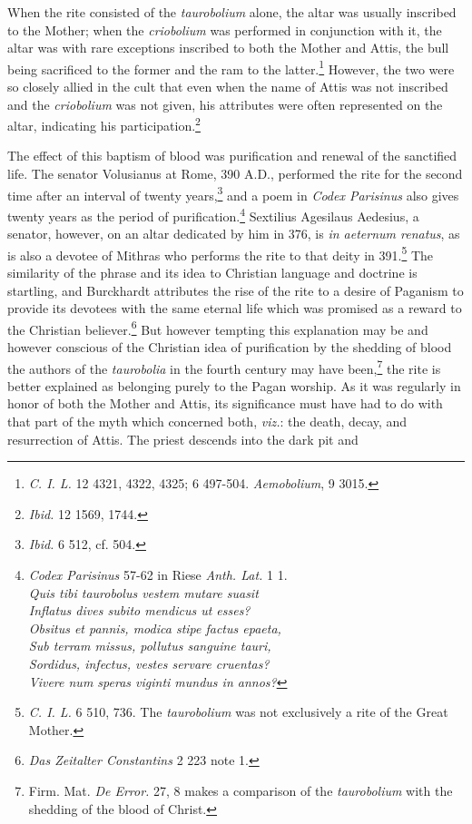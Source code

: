 \documentclass[a4paper, 11pt, oneside, polutonikogreek, english]{article}
\begin{document}
When the rite consisted of the \emph{taurobolium} alone, the altar was usually inscribed to the Mother; when the \emph{criobolium} was performed in conjunction with it, the altar was with rare exceptions inscribed to both the Mother and Attis, the bull being sacrificed to the former and the ram to the latter.\footnote{\emph{C. I. L.} 12 4321, 4322, 4325; 6 497-504. \emph{Aemobolium}, 9 3015.} However, the two were so closely allied in the cult that even when the name of Attis was not inscribed and the \emph{criobolium} was not given, his attributes were often represented on the altar, indicating his participation.\footnote{\emph{Ibid.} 12 1569, 1744.}

The effect of this baptism of blood was purification and renewal of the sanctified life. The senator Volusianus at Rome, 390 \textsc{A.D.}, performed the rite for the second time after an interval of twenty years,\footnote{\emph{Ibid.} 6 512, cf. 504.} and a poem in \emph{Codex Parisinus} also gives twenty years as the period of purification.\footnote{\emph{Codex Parisinus} 57-62 in Riese \emph{Anth. Lat.} 1 1.\\\hspace*{10mm}\emph{Quis tibi taurobolus vestem mutare suasit}\\\hspace*{10mm}\emph{Inflatus dives subito mendicus ut esses?}\\\hspace*{10mm}\emph{Obsitus et pannis, modica stipe factus epaeta,}\\\hspace*{10mm}\emph{Sub terram missus, pollutus sanguine tauri,}\\\hspace*{10mm}\emph{Sordidus, infectus, vestes servare cruentas?}\\\hspace*{10mm}\emph{Vivere num speras viginti mundus in annos?}} Sextilius Agesilaus Aedesius, a senator, however, on an altar dedicated by him in 376, is \emph{in aeternum renatus}, as is also a devotee of Mithras who performs the rite to that deity in 391.\footnote{\emph{C. I. L.} 6 510, 736. The \emph{taurobolium} was not exclusively a rite of the Great Mother.} The similarity of the phrase and its idea to Christian language and doctrine is startling, and Burckhardt attributes the rise of the rite to a desire of Paganism to provide its devotees with the same eternal life which was promised as a reward to the Christian believer.\footnote{\emph{Das Zeitalter Constantins} 2 223 note 1.} But however tempting this explanation may be and however conscious of the Christian idea of purification by the shedding of blood the authors of the \emph{taurobolia} in the fourth century may have been,\footnote{Firm. Mat. \emph{De Error.} 27, 8 makes a comparison of the \emph{taurobolium} with the shedding of the blood of Christ.} the rite is better explained as belonging purely to the Pagan worship. As it was regularly in honor of both the Mother and Attis, its significance must have had to do with that part of the myth which concerned both, \emph{viz.}: the death, decay, and resurrection of Attis. The priest descends into the dark pit and 
\end{document}
